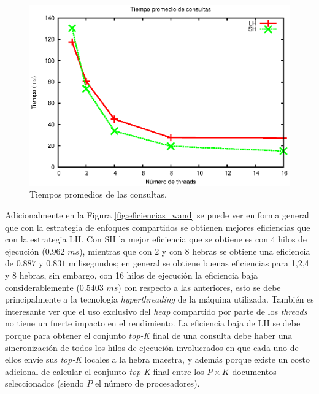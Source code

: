 \begin{figure}[tp]
\centering
\includegraphics[scale=.75]{images/tiempos_wand.eps}
\caption{Tiempos promedios de las consultas.}
\label{fig:tiempos_wand}
\end{figure}

Adicionalmente en la Figura \ref{fig:eficiencias_wand} se puede ver en forma general que con la estrategia de enfoques compartidos se obtienen mejores eficiencias que con la estrategia LH. Con SH la mejor eficiencia que se obtiene es con 4 hilos de ejecución ($0.962$ $ms$), mientras que con 2 y con 8 hebras se obtiene una eficiencia de $0.887$ y $0.831$ milisegundos; en general se obtiene buenas eficiencias para 1,2,4 y 8 hebras, sin embargo, con 16 hilos de ejecución la eficiencia baja considerablemente ($0.5403$ $ms$) con respecto a las anteriores, esto se debe principalmente a la tecnología \textit{hyperthreading} de la máquina utilizada. También es interesante ver que el uso exclusivo del \textit{heap} compartido por parte de los \textit{threads} no tiene un fuerte impacto en el rendimiento. La eficiencia baja de LH se debe porque para obtener el conjunto \textit{top-K} final de una consulta debe haber una sincronización de todos los hilos de ejecución involucrados en que cada uno de ellos envíe sus \textit{top-K} locales a la hebra maestra, y además porque existe un costo adicional de calcular el conjunto \textit{top-K} final entre los $P \times K$ documentos seleccionados (siendo $P$ el número de procesadores). 

